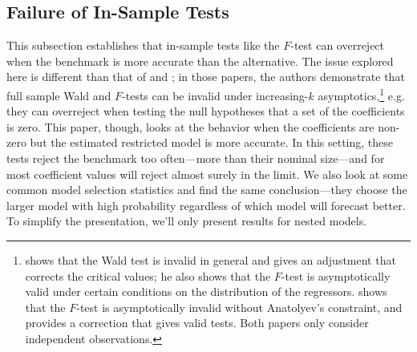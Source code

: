 \documentclass[11pt]{article}
\begin{document}
\subsection{Failure of In-Sample Tests}\label{sec:insample}
This subsection establishes that in-sample tests like the $F$-test can
overreject when the benchmark is more accurate than the alternative.
The issue explored here is different than that of \citet{Cal:11c} and
\citet{Ana:12}; in those papers, the authors demonstrate that full
sample Wald and $F$-tests can be invalid under increasing-$k$
asymptotics,\footnote{\citet{Ana:12} shows that the Wald test is
  invalid in general and gives an adjustment that corrects the
  critical values; he also shows that the $F$-test is asymptotically
  valid under certain conditions on the distribution of the
  regressors.  \citet{Cal:11c} shows that the $F$-test is
  asymptotically invalid without Anatolyev's constraint, and provides
  a correction that gives valid tests.  Both papers only consider
  independent observations.} e.g. they can overreject when testing the
null hypotheses that a set of the coefficients is zero.  This paper,
though, looks at the behavior when the coefficients are non-zero but
the estimated restricted model is more accurate.  In this setting,
these tests reject the benchmark too often---more than their nominal
size---and for most coefficient values will reject almost surely in
the limit.  We also look at some common model selection statistics and
find the same conclusion---they choose the larger model with high
probability regardless of which model will forecast better.  To
simplify the presentation, we'll only present results for nested
models.
\end{document}
